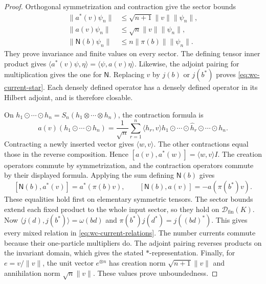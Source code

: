 \documentclass[11pt]{article}
\theoremstyle{definition}
\theoremstyle{remark}
\numberwithin{equation}{section}
\begin{document}
\begin{proof}
Orthogonal symmetrization and contraction give the sector bounds
\begin{equation}
 \begin{aligned}
 \|a^*(v)\psi_n\|&\leq\sqrt{n+1}\|v\|\|\psi_n\|,\\
 \|a(v)\psi_n\|&\leq\sqrt n\|v\|\|\psi_n\|,\\
 \|\mathsf N(b)\psi_n\|&\leq n\|\pi(b)\|\|\psi_n\|.
 \end{aligned}
 \label{eq:wc-sector-bounds}
\end{equation}
They prove invariance and finite values on every sector.
The defining tensor inner product gives
$\langle a^*(v)\psi,\eta\rangle=\langle\psi,a(v)\eta\rangle$.
Likewise, the adjoint pairing for multiplication gives the one for
$\mathsf N$.  Replacing $v$ by $j(b)$ or $j(b^*)$ proves
\eqref{eq:wc-current-star}.
Each densely defined operator has a densely defined operator in its
Hilbert adjoint, and is therefore closable.

On $h_1\odot\cdots\odot h_n=S_n(h_1\otimes\cdots\otimes h_n)$,
the contraction formula is
\[
 a(v)(h_1\odot\cdots\odot h_n)
 =\frac1{\sqrt n}\sum_{r=1}^n\langle h_r,v\rangle
 h_1\odot\cdots\odot\widehat h_r\odot\cdots\odot h_n.
\]
Contracting a newly inserted vector gives $\langle w,v\rangle$.
The other contractions equal those in the reverse composition.
Hence $[a(v),a^*(w)]=\langle w,v\rangle I$.
The creation operators commute by symmetrization, and the contraction
operators commute by their displayed formula.
Applying the sum defining $\mathsf N(b)$ gives
\[
 [\mathsf N(b),a^*(v)]=a^*(\pi(b)v),\qquad
 [\mathsf N(b),a(v)]=-a(\pi(b^*)v).
\]
These equalities hold first on elementary symmetric tensors.
The sector bounds extend each fixed product to the whole input sector,
so they hold on $\mathcal D_{\mathrm{fin}}(K)$.
Now
$\langle j(d),j(b^*)\rangle=\omega(bd)$ and
$\pi(b^*)j(d^*)=j((bd)^*)$.
This gives every mixed relation in \eqref{eq:wc-current-relations}.
The number currents commute because their one-particle multipliers do.
The adjoint pairing reverses products on the invariant domain, which
gives the stated $*$-representation.
Finally, for $e=v/\|v\|$, the unit vector $e^{\otimes n}$ has creation
norm $\sqrt{n+1}\|v\|$ and annihilation norm $\sqrt n\|v\|$.
These values prove unboundedness.
\end{proof}
\end{document}
